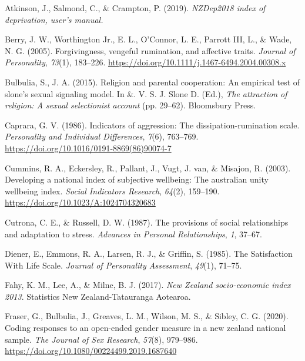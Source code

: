 \documentclass[
  letterpaper,
  DIV=11,
  numbers=noendperiod]{scrartcl}
\newlength{\cslhangindent}
\newlength{\cslentryspacingunit} %
\newenvironment{CSLReferences}[2] %
 {%
  \setlength{\parindent}{0pt}
  \ifodd #1
  \let\oldpar\par
  \def\par{\hangindent=\cslhangindent\oldpar}
  \fi
  \setlength{\parskip}{#2\cslentryspacingunit}
 }%
 {}
\begin{document}
\hypertarget{refs}{}
\begin{CSLReferences}{1}{0}
\leavevmode{}%
Atkinson, J., Salmond, C., \& Crampton, P. (2019). \emph{NZDep2018 index
of deprivation, user{'}s manual.}

\leavevmode{}%
Berry, J. W., Worthington Jr., E. L., O'Connor, L. E., Parrott III, L.,
\& Wade, N. G. (2005). Forgivingness, vengeful rumination, and affective
traits. \emph{Journal of Personality}, \emph{73}(1), 183--226.
\url{https://doi.org/10.1111/j.1467-6494.2004.00308.x}

\leavevmode{}%
Bulbulia, S., J. A. (2015). Religion and parental cooperation: An
empirical test of slone's sexual signaling model. In \&. V. S. J. Slone
D. (Ed.), \emph{The attraction of religion: A sexual selectionist
account} (pp. 29--62). Bloomsbury Press.

\leavevmode{}%
Caprara, G. V. (1986). Indicators of aggression: The
dissipation-rumination scale. \emph{Personality and Individual
Differences}, \emph{7}(6), 763--769.
\url{https://doi.org/10.1016/0191-8869(86)90074-7}

\leavevmode{}%
Cummins, R. A., Eckersley, R., Pallant, J., Vugt, J. van, \& Misajon, R.
(2003). Developing a national index of subjective wellbeing: The
australian unity wellbeing index. \emph{Social Indicators Research},
\emph{64}(2), 159--190. \url{https://doi.org/10.1023/A:1024704320683}

\leavevmode{}%
Cutrona, C. E., \& Russell, D. W. (1987). The provisions of social
relationships and adaptation to stress. \emph{Advances in Personal
Relationships}, \emph{1}, 37--67.

\leavevmode{}%
Diener, E., Emmons, R. A., Larsen, R. J., \& Griffin, S. (1985). The
Satisfaction With Life Scale. \emph{Journal of Personality Assessment},
\emph{49}(1), 71--75.

\leavevmode{}%
Fahy, K. M., Lee, A., \& Milne, B. J. (2017). \emph{New Zealand
socio-economic index 2013}. Statistics New Zealand-Tatauranga Aotearoa.

\leavevmode{}%
Fraser, G., Bulbulia, J., Greaves, L. M., Wilson, M. S., \& Sibley, C.
G. (2020). Coding responses to an open-ended gender measure in a new
zealand national sample. \emph{The Journal of Sex Research},
\emph{57}(8), 979--986.
\url{https://doi.org/10.1080/00224499.2019.1687640}


\end{CSLReferences}
\end{document}
